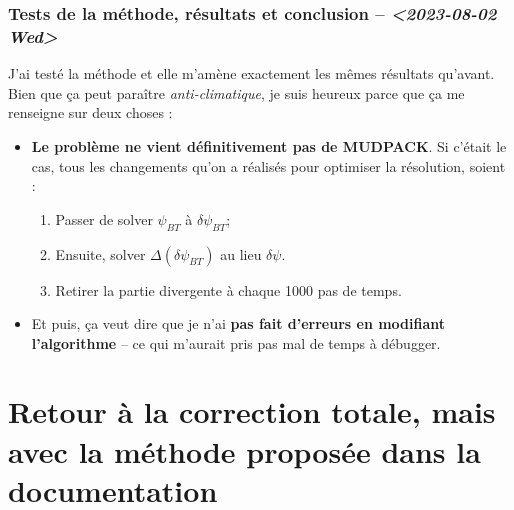 \documentclass[10pt]{article}
\numberwithin{equation}{section}
\begin{document}
\subsubsection{Tests de la méthode, résultats et conclusion -- \textit{<2023-08-02 Wed>}}
\label{sec:org158c775}
J'ai testé la méthode et elle m'amène exactement les mêmes résultats qu'avant.
Bien que ça peut paraître \emph{anti-climatique}, je suis heureux parce que ça me renseigne sur deux choses :
\begin{itemize}
\item \textbf{Le problème ne vient définitivement pas de MUDPACK}.
Si c'était le cas, tous les changements qu'on a réalisés pour optimiser la résolution, soient :
\begin{enumerate}
\item Passer de solver \(\psi_{BT}\) à \(\delta \psi_{BT}\);
\item Ensuite, solver \(\Delta (\delta \psi_{BT})\) au lieu \(\delta\psi\).
\item Retirer la partie divergente à chaque 1000 pas de temps.
\end{enumerate}

\item Et puis, ça veut dire que je n'ai \textbf{pas fait d'erreurs en modifiant l'algorithme} -- ce qui m'aurait pris pas mal de temps à débugger.
\end{itemize}
\section{Retour à la correction totale, mais avec la méthode proposée dans la documentation}
\label{sec:org47dd584}
\end{document}
